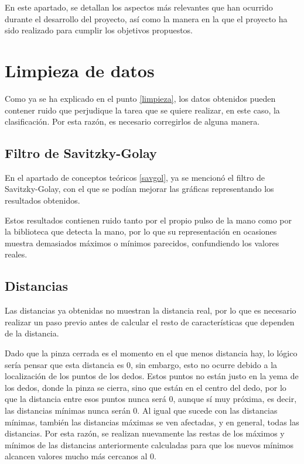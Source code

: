 En este apartado, se detallan los aspectos más relevantes que han ocurrido durante el desarrollo del proyecto, así como la manera en la que el proyecto ha sido realizado para cumplir los objetivos propuestos.

\section{Limpieza de datos}
Como ya se ha explicado en el punto \ref{limpieza}, los datos obtenidos pueden contener ruido que perjudique la tarea que se quiere realizar, en este caso, la clasificación. Por esta razón, es necesario corregirlos de alguna manera.

\subsection{Filtro de Savitzky-Golay}
En el apartado de conceptos teóricos \ref{savgol}, ya se mencionó el filtro de Savitzky-Golay, con el que se podían mejorar las gráficas representando los resultados obtenidos.

Estos resultados contienen ruido tanto por el propio pulso de la mano como por la biblioteca que detecta la mano, por lo que su representación en ocasiones muestra demasiados máximos o mínimos parecidos, confundiendo los valores reales.

\subsection{Distancias} 
Las distancias ya obtenidas no muestran la distancia  real, por lo que es necesario realizar un paso previo antes de calcular el resto de características que dependen de la distancia. 

Dado que la pinza cerrada es el momento en el que menos distancia hay, lo lógico sería pensar que esta distancia es 0, sin embargo, esto no ocurre debido a la localización de los puntos de los dedos. Estos puntos no están justo en la yema de los dedos, donde la pinza se cierra, sino que están en el centro del dedo, por lo que la distancia entre esos puntos nunca será 0, aunque sí muy próxima, es decir, las distancias mínimas nunca serán 0. Al igual que sucede con las distancias mínimas, también las distancias máximas se ven afectadas, y en general, todas las distancias. Por esta razón, se realizan nuevamente las restas de los máximos y mínimos de las distancias anteriormente calculadas para que los nuevos mínimos alcancen valores mucho más cercanos al 0. 

